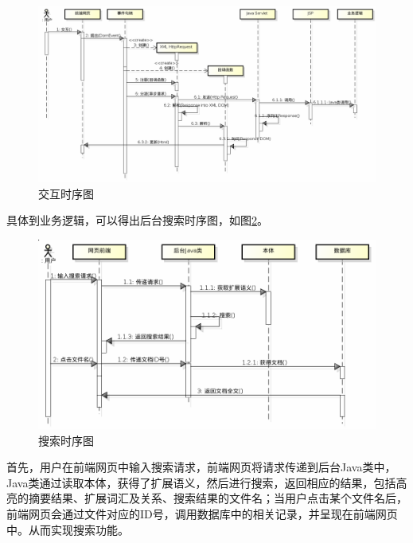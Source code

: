 \documentclass[12pt,a4paper]{article}
\newcommand{\wuhao}{\fontsize{10.5pt}{\baselineskip}\selectfont}
\begin{document}
	\begin{figure}[htbp] 
	\centering\includegraphics[width=6in]{fig/Sequence.png} 
	\caption{\wuhao {\Times B/S}交互时序图}\label{fig:B/S交互时序图}
	\end{figure} 
	
	具体到业务逻辑，可以得出后台搜索时序图，如图\ref{fig:搜索时序图}。
	
	\begin{figure}[htbp] 
	\centering\includegraphics[width=5in]{fig/SearchSequence.png} 
	\caption{\wuhao 搜索时序图}\label{fig:搜索时序图} 
	\end{figure}
	
	首先，用户在前端网页中输入搜索请求，前端网页将请求传递到后台{\Times Java}类中，{\Times Java}类通过读取本体，获得了扩展语义，然后进行搜索，返回相应的结果，包括高亮的摘要结果、扩展词汇及关系、搜索结果的文件名；当用户点击某个文件名后，前端网页会通过文件对应的{\Times ID}号，调用数据库中的相关记录，并呈现在前端网页中。从而实现搜索功能。
		
\end{document}
